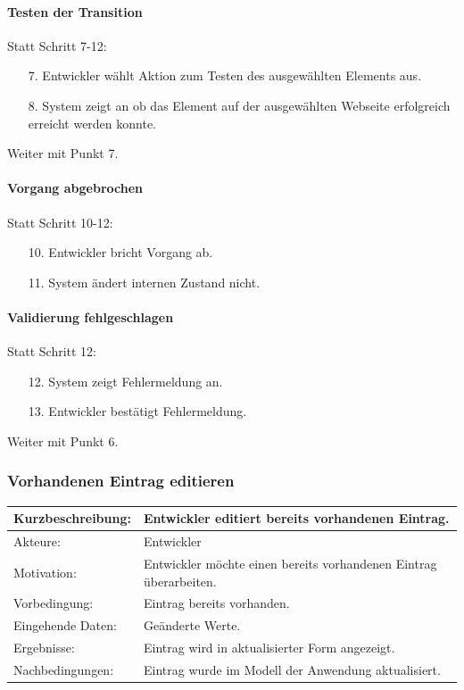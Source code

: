 \paragraph{Testen der Transition}
Statt Schritt 7-12:
\begin{itemize}
\item[7.] Entwickler wählt Aktion zum Testen des ausgewählten Elements aus. 
\item[8.] System zeigt an ob das Element auf der ausgewählten Webseite erfolgreich erreicht werden konnte. 
\end{itemize}
Weiter mit Punkt 7.

\paragraph{Vorgang abgebrochen}
Statt Schritt 10-12:
\begin{itemize}[itemsep=0pt]
\item[10.] Entwickler bricht Vorgang ab. 
\item[11.] System ändert internen Zustand nicht. 
\end{itemize}

\paragraph{Validierung fehlgeschlagen}
Statt Schritt 12:
\begin{itemize}
\item[12.] System zeigt Fehlermeldung an. 
\item[13.] Entwickler bestätigt Fehlermeldung. 
\end{itemize}
Weiter mit Punkt 6. 


\subsubsection{Vorhandenen Eintrag editieren}
\label{sec:edit_entry}

\begin{tabular}[h]{|p{4cm}|p{}|}
\hline 
\rule[-1ex]{0pt}{2.5ex}Kurzbeschreibung: & 
Entwickler editiert bereits vorhandenen Eintrag. \\  
\hline 
\rule[-1ex]{0pt}{2.5ex}Akteure: & 
Entwickler \\ 
\hline 
\rule[-1ex]{0pt}{2.5ex}Motivation: & 
Entwickler möchte einen bereits vorhandenen Eintrag überarbeiten. \\ 
\hline 
\rule[-1ex]{0pt}{2.5ex}Vorbedingung: & 
Eintrag bereits vorhanden. \\ 
\hline 
\rule[-1ex]{0pt}{2.5ex}Eingehende Daten: & Geänderte Werte. \\ 
\hline 
\rule[-1ex]{0pt}{2.5ex}Ergebnisse: & Eintrag wird in aktualisierter Form angezeigt. \\ 
\hline 
\rule[-1ex]{0pt}{2.5ex}Nachbedingungen: & Eintrag wurde im Modell der Anwendung aktualisiert.  \\ 
\hline 
\end{tabular} 

